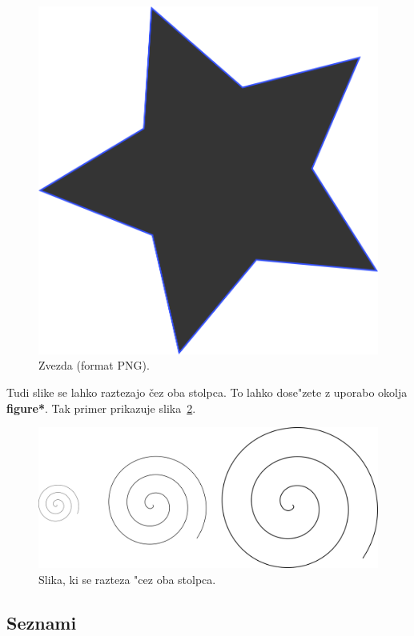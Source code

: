 \documentclass[sigconf,nonacm]{acmart}
\begin{document}
\begin{figure}
    \centering
    \includegraphics[scale=0.5]{star.png}
    \caption{Zvezda (format PNG).}
    \label{fig:star}
\end{figure}

Tudi slike se lahko raztezajo čez oba stolpca.  To lahko dose"zete z uporabo
okolja \textbf{figure*}.  Tak primer prikazuje slika~\ref{fig:spin}.

\begin{figure}
    \centering
    \includegraphics[scale=0.8]{spin.png}
    \caption{Slika, ki se razteza "cez oba stolpca.}
    \label{fig:spin}
\end{figure}

\subsection{Seznami}
\end{document}
